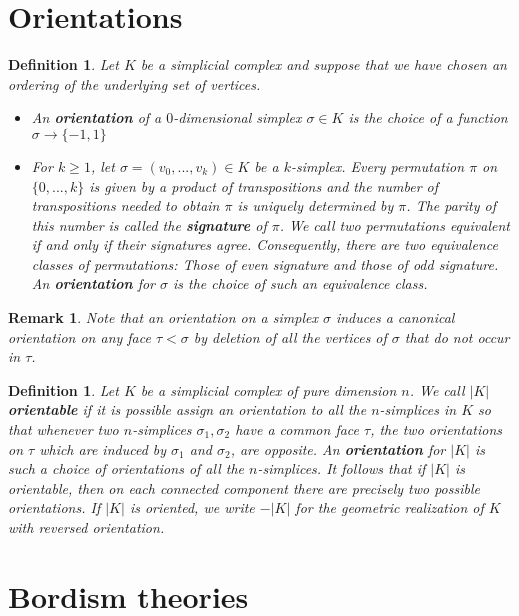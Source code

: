 \documentclass{scrreprt}
\newtheorem{definition}[prop]{Definition}
\newtheorem{remark}[prop]{Remark}
\begin{document}
\section{Orientations}

\begin{definition}Let $K$ be a simplicial complex and suppose that we have chosen an ordering of the underlying set of vertices.
\begin{itemize}
\item An \textbf{orientation} of a $0$-dimensional simplex $\sigma \in K$ is the choice of a function $\sigma \to \{ -1,1 \}$
\item For $k \geq 1$, let $\sigma = (v_0,...,v_k) \in K$ be a $k$-simplex. Every permutation $\pi$ on $\{ 0,...,k \}$ is given by a product of transpositions and the number of transpositions needed to obtain $\pi$ is uniquely determined by $\pi$. The parity of this number is called the \textbf{signature} of $\pi$. We call two permutations equivalent if and only if their signatures agree. Consequently, there are two equivalence classes of permutations: Those of even signature and those of odd signature. An \textbf{orientation} for $\sigma$ is the choice of such an equivalence class.
\end{itemize}
\end{definition}

\begin{remark}
Note that an orientation on a simplex $\sigma$ induces a canonical orientation on any face $\tau < \sigma$ by deletion of all the vertices of $\sigma$ that do not occur in $\tau$.
\end{remark}

\begin{definition}
Let $K$ be a simplicial complex of pure dimension $n$. We call $|K|$ \textbf{orientable} if it is possible assign an orientation to all the $n$-simplices in $K$ so that whenever two $n$-simplices $\sigma_1, \sigma_2$ have a common face $\tau$, the two orientations on $\tau$ which are induced by $\sigma_1$ and $\sigma_2$, are opposite. An \textbf{orientation} for $|K|$ is such a choice of orientations of all the $n$-simplices. It follows that if $|K|$ is orientable, then on each connected component there are precisely two possible orientations. If $|K|$ is oriented, we write $-|K|$ for the geometric realization of $K$ with reversed orientation.
\end{definition}

\section{Bordism theories}
\end{document}
